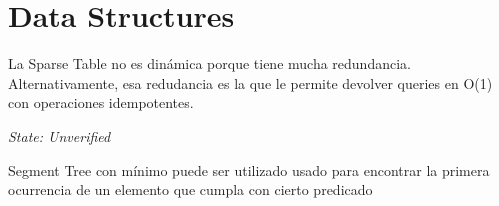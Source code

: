 \section{Data Structures}

La Sparse Table no es dinámica porque tiene mucha redundancia. Alternativamente, esa redudancia es la que le permite devolver queries en O(1) con operaciones idempotentes.

\textit{State: Unverified}

Segment Tree con mínimo puede ser utilizado usado para encontrar la primera ocurrencia de un elemento que cumpla con cierto predicado
